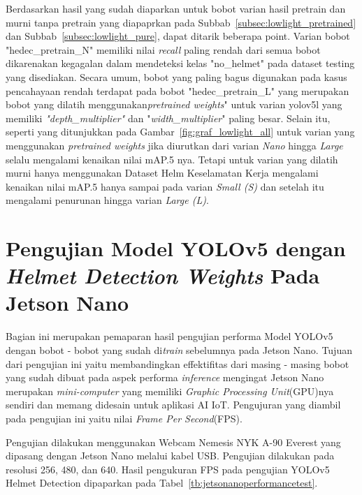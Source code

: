   \par Berdasarkan hasil yang sudah diaparkan untuk bobot varian hasil 
  pretrain dan murni tanpa pretrain yang diapaprkan pada Subbab~\ref{subsec:lowlight_pretrained} 
  dan Subbab~\ref{subsec:lowlight_pure}, dapat ditarik beberapa point. Varian bobot "hedec\_pretrain\_N"
  memiliki nilai \emph{recall} paling rendah dari semua bobot dikarenakan kegagalan dalam mendeteksi
  kelas "no\_helmet" pada dataset testing yang disediakan. Secara umum, bobot yang paling bagus digunakan
  pada kasus pencahayaan rendah terdapat pada bobot "hedec\_pretrain\_L" yang merupakan
  bobot yang dilatih menggunakan\emph{pretrained weights}" untuk varian yolov5l yang memiliki
  \emph{"depth\_multiplier"} dan "\emph{width\_multiplier}" paling besar. Selain itu, seperti yang
  ditunjukkan pada Gambar~\ref{fig:graf_lowlight_all} untuk varian yang menggunakan
  \emph{pretrained weights} jika diurutkan dari varian \emph{Nano} hingga \emph{Large} selalu mengalami
  kenaikan nilai mAP.5 nya. Tetapi untuk varian yang dilatih murni hanya menggunakan Dataset Helm Keselamatan Kerja
  mengalami kenaikan nilai mAP.5 hanya sampai pada varian \emph{Small (S)} dan setelah itu mengalami penurunan hingga varian \emph{Large (L)}.



\section{Pengujian Model YOLOv5 dengan \emph{Helmet Detection Weights} Pada Jetson Nano}
\label{sec:jetsonnano_hedectest}

\par Bagian ini merupakan pemaparan hasil pengujian performa Model YOLOv5 dengan bobot - bobot yang sudah di\emph{train}
sebelumnya pada Jetson Nano. Tujuan dari pengujian ini yaitu membandingkan effektifitas dari masing - masing
bobot yang sudah dibuat pada aspek performa \emph{inference} mengingat Jetson Nano merupakan \emph{mini-computer} yang memiliki
\emph{Graphic Processing Unit}(GPU)nya sendiri dan memang didesain untuk aplikasi AI IoT. Pengujuran yang diambil pada pengujian ini
yaitu nilai \emph{Frame Per Second}(FPS).

 
\par Pengujian dilakukan menggunakan Webcam Nemesis NYK A-90 Everest yang dipasang dengan Jetson Nano melalui kabel USB. 
Pengujian dilakukan pada resolusi 256, 480, dan 640. Hasil pengukuran FPS pada pengujian YOLOv5 Helmet Detection dipaparkan pada Tabel~\ref{tb:jetsonanoperformancetest}.



